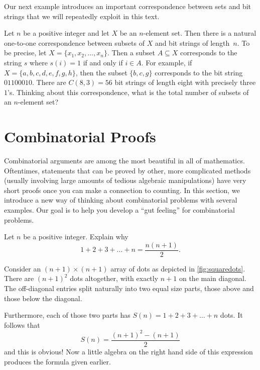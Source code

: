 Our next example introduces an important correspondence between sets
and bit strings that we will repeatedly exploit in this text.

\begin{example}
  Let $n$ be a positive integer and let $X$ be an $n$-element set.
  Then there is a natural one-to-one correspondence between subsets of
  $X$ and bit strings of length~$n$.  To be precise, let
  $X=\{x_1,x_2,\dots,x_n\}$.  Then a subset $A\subseteq X$ corresponds
  to the string $s$ where $s(i) = 1$ if and only if $i\in A$.  For
  example, if $X=\{a,b,c,d,e,f,g,h\}$, then the subset $\{b,c,g\}$
  corresponds to the bit string $01100010$. There are $C(8,3)=56$ bit
  strings of length eight with precisely three $1$'s. Thinking about
  this correspondence, what is the total number of subsets of an
  $n$-element set?
\end{example}

\section{Combinatorial Proofs}\label{s:strings:comb-proof}

Combinatorial arguments are among the most beautiful in all of
mathematics. Oftentimes, statements that can be proved by other,
more complicated methods (usually involving large amounts of tedious algebraic
manipulations) have very short proofs once you can make a connection
to counting. In this section, we introduce a new way of thinking about
combinatorial problems with several examples. Our goal is to help you
develop a ``gut feeling'' for combinatorial problems.

\begin{example}
Let $n$ be a positive integer. Explain why
\[
1+2+3+\dots+n=\frac{n(n+1)}{2}.
\]

Consider an $(n+1)\times (n+1)$ array of dots as depicted
in \autoref{fig:squaredots}.  There are 
$(n+1)^2$ dots altogether, with exactly $n+1$
on the main diagonal.  
The off-diagonal entries split
naturally into two equal size parts, those above and
those below the diagonal.  

Furthermore, each of those
two parts has $S(n)=1+2+3+\dots+n$ dots.
It follows that
\[
S(n)=\frac{(n+1)^2-(n+1)}{2}
\]
and this is obvious! Now a little algebra on the right
hand side of this expression produces the formula given
earlier.

\end{example}

